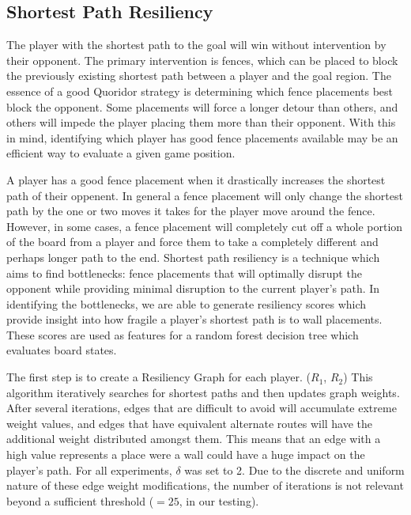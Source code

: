 \documentclass[10pt]{article}
\begin{document}
\subsection{Shortest Path Resiliency}

The player with the shortest path to the goal will win without intervention by their opponent. The primary intervention is fences, which can be placed to block the previously existing shortest path between a player and the goal region. The essence of a good Quoridor strategy is determining which fence placements best block the opponent. Some placements will force a longer detour than others, and others will impede the player placing them more than their opponent. With this in mind, identifying which player has good fence placements available may be an efficient way to evaluate a given game position.  

A player has a good fence placement when it drastically increases the shortest path of their oppenent. In general a fence placement will only change the shortest path by the one or two moves it takes for the player move around the fence. However, in some cases, a fence placement will completely cut off a whole portion of the board from a player and force them to take a completely different and perhaps longer path to the end. Shortest path resiliency is a technique which aims to find bottlenecks: fence placements that will optimally disrupt the opponent while providing minimal disruption to the current player's path. In identifying the bottlenecks, we are able to generate resiliency scores which provide insight into how fragile a player's shortest path is to wall placements. These scores are used as features for a random forest decision tree which evaluates board states.

The first step is to create a Resiliency Graph for each player. ($R_1$, $R_2$) This algorithm iteratively searches for shortest paths and then updates graph weights. After several iterations, edges that are difficult to avoid will accumulate extreme weight values, and edges that have equivalent alternate routes will have the additional weight distributed amongst them. This means that an edge with a high value represents a place were a wall could have a huge impact on the player's path. For all experiments, $\delta$ was set to 2. Due to the discrete and uniform nature of these edge weight modifications, the number of iterations is not relevant beyond a sufficient threshold ($=25$, in our testing).
\end{document}
